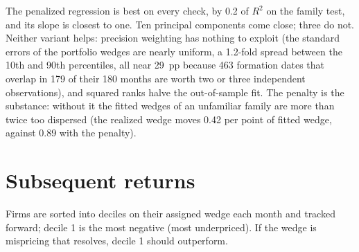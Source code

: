 \documentclass[11pt]{article}
\begin{document}
The penalized regression is best on every check, by 0.2 of $R^2$ on the
family test, and its slope is closest to one. Ten principal components come
close; three do not. Neither variant helps: precision weighting has nothing
to exploit (the standard errors of the portfolio wedges are nearly uniform,
a 1.2-fold spread between the 10th and 90th percentiles, all near
29~pp because 463 formation dates that overlap in 179 of their
180 months are worth two or three independent observations), and squared
ranks halve the out-of-sample fit. The penalty is the substance: without it
the fitted wedges of an unfamiliar family are more than twice too dispersed
(the realized wedge moves 0.42 per point of fitted wedge, against 0.89 with
the penalty).

\section{Subsequent returns}

Firms are sorted into deciles on their assigned wedge each month and
tracked forward; decile 1 is the most negative (most underpriced). If the
wedge is mispricing that resolves, decile 1 should outperform.
\end{document}
